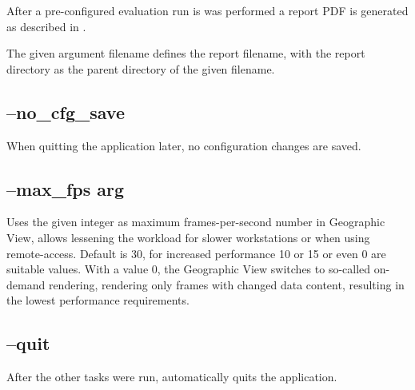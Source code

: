 After a pre-configured evaluation run is was performed a report PDF is generated as described in .

The given argument filename defines the report filename, with the report directory as the parent directory of the given filename.

\subsection{--no\_cfg\_save}

When quitting the application later, no configuration changes are saved.

\subsection{--max\_fps arg}

Uses the given integer as maximum frames-per-second number in Geographic View, allows lessening the workload for slower workstations or when using remote-access. Default is 30, for increased performance 10 or 15 or even 0 are suitable values. With a value 0, the Geographic View switches to so-called on-demand rendering, rendering only frames with changed data content, resulting in the lowest performance requirements.

\subsection{--quit}

After the other tasks were run, automatically quits the application.


